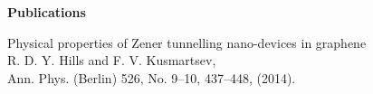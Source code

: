 %
\thispagestyle{plain}
\begin{center}
	\Large
	\textbf{Publications}
\end{center}
\cite{b52} Physical properties of Zener tunnelling nano-devices in graphene\\
R. D. Y. Hills and F. V. Kusmartsev,\\
Ann. Phys. (Berlin) 526, No. 9–10, 437–448, (2014).

%
